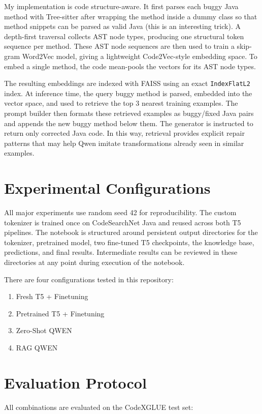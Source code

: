 \documentclass[11pt]{article}
\begin{document}
My implementation is  code structure-aware. It first parses each buggy Java method with Tree-sitter after wrapping the method inside a dummy class so that method snippets can be parsed as valid Java (this is an interesting trick). A depth-first traversal collects AST node types, producing one structural token sequence per method. These AST node sequences are then used to train a skip-gram Word2Vec model, giving a lightweight Code2Vec-style embedding space. To embed a single method, the code mean-pools the vectors for its AST node types.

The resulting embeddings are indexed with FAISS using an exact \texttt{IndexFlatL2} index. At inference time, the query buggy method is parsed, embedded into the vector space, and used to retrieve the top 3 nearest training examples. The prompt builder then formats these retrieved examples as buggy/fixed Java pairs and appends the new buggy method below them. The generator is instructed to return only corrected Java code. In this way, retrieval provides explicit repair patterns that may help Qwen imitate transformations already seen in similar examples.

\section{Experimental Configurations}

All major experiments use random seed 42 for reproducibility. The custom tokenizer is trained once on CodeSearchNet Java and reused across both T5 pipelines. The notebook is structured around persistent output directories for the tokenizer, pretrained model, two fine-tuned T5 checkpoints, the knowledge base, predictions, and final results. Intermediate results can be reviewed in these directories at any point during execution of the notebook. 

There are four configurations tested in this repository:
\begin{enumerate}
    \item Fresh T5 + Finetuning
    \item Pretrained T5 + Finetuning
    \item Zero-Shot QWEN
    \item RAG QWEN
\end{enumerate}

\section{Evaluation Protocol}
All combinations are evaluated on the CodeXGLUE test set:
\end{document}
